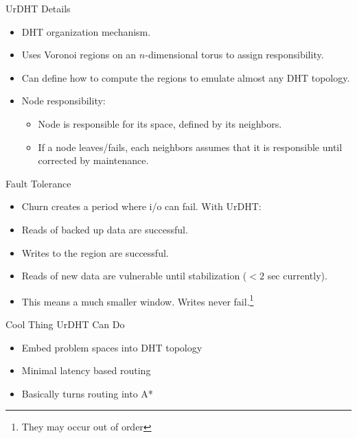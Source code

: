 \documentclass[11pt]{beamer}
\begin{document}
\begin{frame}{UrDHT Details}
	\begin{itemize}
		\item DHT organization mechanism.
		
		\item Uses Voronoi regions on an $n$-dimensional torus to assign responsibility.
		\item Can define how to compute the regions to emulate almost any DHT topology.
		\item Node responsibility:
		\begin{itemize}
			\item Node is  responsible for its space, defined by its neighbors.
			\item If a node leaves/fails, each neighbors assumes that it is responsible until corrected by maintenance. 
		\end{itemize}
	\end{itemize}


\end{frame}

\begin{frame}{Fault Tolerance}
	\begin{itemize}
		\item Churn creates a period where i/o can fail.  With UrDHT:
		\item Reads of backed up data are successful.
		\item Writes to the region are successful. 
		\item Reads of new data are vulnerable until stabilization ($ <2$ sec currently).
		\item This means a much smaller window.  Writes never fail.\footnote{They may occur out of order}
		
	\end{itemize}


\end{frame}


\begin{frame}{Cool Thing UrDHT Can Do}
	\begin{itemize}
		\item Embed problem spaces into DHT topology
		\item Minimal latency based routing
		\item Basically turns routing into A*
		
	\end{itemize}
\end{frame}
\end{document}

